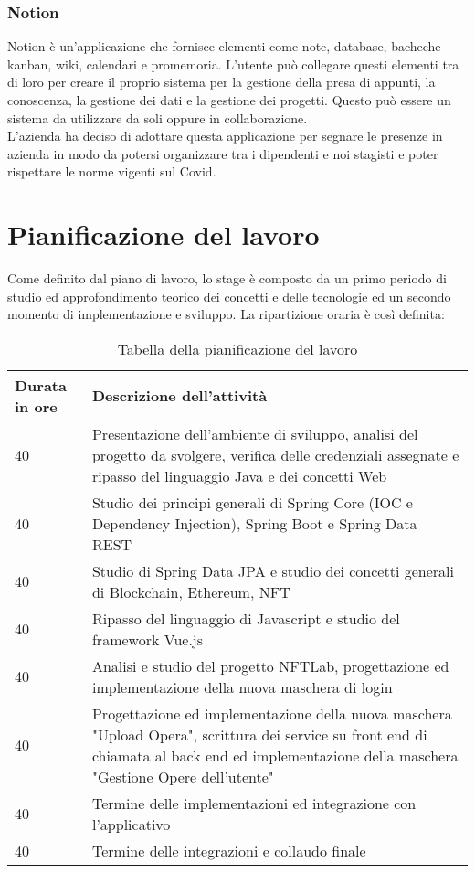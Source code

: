 \subsubsection{Notion}
Notion è un'applicazione che fornisce elementi come note, database, bacheche kanban, wiki, calendari e promemoria. L'utente può collegare questi elementi tra di loro per creare il proprio sistema per la gestione della presa di appunti, la conoscenza, la gestione dei dati e la gestione dei progetti. Questo può essere un sistema da utilizzare da soli oppure in collaborazione.\\
L'azienda ha deciso di adottare questa applicazione per segnare le presenze in azienda in modo da potersi organizzare tra i dipendenti e noi stagisti e poter rispettare le norme vigenti sul Covid.

\section{Pianificazione del lavoro}
Come definito dal piano di lavoro, lo stage è composto da un primo periodo di studio ed approfondimento teorico dei concetti e delle tecnologie ed un secondo momento di implementazione e sviluppo. La ripartizione oraria è così definita:
\begin{table}[H]
	\caption{Tabella della pianificazione del lavoro}
	\label{tab:pianificazione-del-lavoro}
	\renewcommand{\arraystretch}{1.6}
	\begin{tabularx}{\textwidth}{lX}
		\hline
		\textbf{Durata in ore} & \textbf{Descrizione dell'attività}\\
		\hline
		40 & Presentazione dell'ambiente di sviluppo, analisi del progetto da svolgere, verifica delle credenziali assegnate e ripasso del linguaggio Java e dei concetti Web\\
		\hline
		40 & Studio dei principi generali di Spring Core (IOC e Dependency Injection), Spring Boot e Spring Data REST \\
		\hline
		40 & Studio di Spring Data JPA e studio dei concetti generali di Blockchain, Ethereum, NFT\\
		\hline
		40 & Ripasso del linguaggio di Javascript e studio del framework Vue.js\\
		\hline
		40 & Analisi e studio del progetto NFTLab, progettazione ed implementazione della nuova maschera di login\\
		\hline
		40 & Progettazione ed implementazione della nuova maschera "Upload Opera", scrittura dei service su front end di chiamata al back end ed implementazione della maschera "Gestione Opere dell'utente"\\
		\hline
		40 & Termine delle implementazioni ed integrazione con l'applicativo\\
		\hline
		40 & Termine delle integrazioni e collaudo finale\\
		\hline
	\end{tabularx}
\end{table}%

